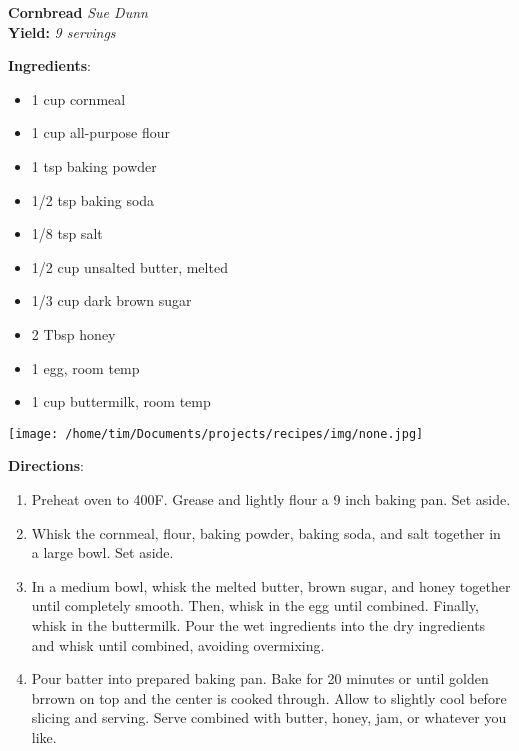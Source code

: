 \documentclass[11pt, twoside, openany]{book}
\begin{document}
\noindent\begin{minipage}[t]{\linewidth}%
{\Large\textbf{Cornbread}} \label{cornbread}\hfill\textit{Sue Dunn}\\
\textbf{Yield:} \textit{9 servings}\\
\noindent\begin{minipage}[t]{0.78\linewidth}%
\textbf{Ingredients}:\vspace{-3mm}
\begin{multicols}{2}
\begin{itemize}\setlength\itemsep{-1mm}
\item 1 cup cornmeal
\item 1 cup all-purpose flour
\item 1 tsp baking powder
\item 1/2 tsp baking soda
\item 1/8 tsp salt
\item 1/2 cup unsalted butter, melted
\item 1/3 cup dark brown sugar
\item 2 Tbsp honey
\item 1 egg, room temp
\item 1 cup buttermilk, room temp
\end{itemize}
\end{multicols}
\end{minipage}
\noindent\begin{minipage}[t]{0.18\linewidth}
\centering \strut\vspace*{-\baselineskip}\newline
\texttt{[image: /home/tim/Documents/projects/recipes/img/none.jpg]}\\
\end{minipage}\vspace{3mm}
\textbf{Directions}:
\vspace{-3mm}\begin{enumerate}\setlength\itemsep{-1mm}
\item Preheat oven to 400F. Grease and lightly flour a 9 inch baking pan. Set aside.
\item Whisk the cornmeal, flour, baking powder, baking soda, and salt together in a large bowl. Set aside.
\item In a medium bowl, whisk the melted butter, brown sugar, and honey together until completely smooth. Then, whisk in the egg until combined. Finally, whisk in the buttermilk. Pour the wet ingredients into the dry ingredients and whisk until combined, avoiding overmixing.
\item Pour batter into prepared baking pan. Bake for 20 minutes or until golden brrown on top and the center is cooked through. Allow to slightly cool before slicing and serving. Serve combined with butter, honey, jam, or whatever you like.
\end{enumerate}
\end{minipage}\vspace{8mm}
\end{document}
